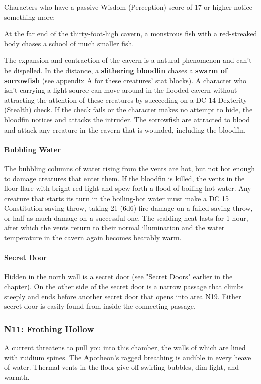 \documentclass[10pt,a4,twoside,twocolumn,openany,nodeprecatedcode]{dndbook}
\begin{document}
Characters who have a passive Wisdom (Perception) score of 17 or higher notice something more:
\begin{DndReadAloud}{}
At the far end of the thirty-foot-high cavern, a monstrous fish with a red-streaked body chases a school of much smaller fish.
\end{DndReadAloud}

The expansion and contraction of the cavern is a natural phenomenon and can't be dispelled.
In the distance, a \textbf{slithering bloodfin} chases a \textbf{swarm of sorrowfish} (see appendix A for these creatures' stat blocks). A character who isn't carrying a light source can move around in the flooded cavern without attracting the attention of these creatures by succeeding on a DC 14 Dexterity (Stealth) check. If the check fails or the character makes no attempt to hide, the bloodfin notices and attacks the intruder. The sorrowfish are attracted to blood and attack any creature in the cavern that is wounded, including the bloodfin.
\paragraph{Bubbling Water}
The bubbling columns of water rising from the vents are hot, but not hot enough to damage creatures that enter them. If the bloodfin is killed, the vents in the floor flare with bright red light and spew forth a flood of boiling-hot water. Any creature that starts its turn in the boiling-hot water must make a DC 15 Constitution saving throw, taking 21 (6d6) fire damage on a failed saving throw, or half as much damage on a successful one. The scalding heat lasts for 1 hour, after which the vents return to their normal illumination and the water temperature in the cavern again becomes bearably warm.
\paragraph{Secret Door}
Hidden in the north wall is a secret door (see "Secret Doors" earlier in the chapter). On the other side of the secret door is a narrow passage that climbs steeply and ends before another secret door that opens into area N19. Either secret door is easily found from inside the connecting passage.
\subsubsection{N11: Frothing Hollow}
\begin{DndReadAloud}{}
A current threatens to pull you into this chamber, the walls of which are lined with ruidium spines. The Apotheon's ragged breathing is audible in every heave of water. Thermal vents in the floor give off swirling bubbles, dim light, and warmth.
\end{DndReadAloud}
\end{document}
